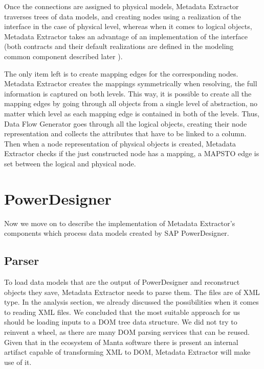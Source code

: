 Once the connections are assigned to physical models, Metadata Extractor traverses trees of data models, and creating nodes using a realization of the  interface in the case of physical level, whereas when it comes to logical objects, Metadata Extractor takes an advantage of an implementation of the  interface (both contracts and their default realizations are defined in the modeling common component described later ).

The only item left is to create mapping edges for the corresponding nodes.
Metadata Extractor creates the mappings symmetrically when resolving, the full information is captured on both levels. 
This way, it is possible to create all the mapping edges by going through all objects from a single level of abstraction, no matter which level as each mapping edge is contained in both of the levels.
Thus, Data Flow Generator goes through all the logical objects, creating their node representation and collects the attributes that have to be linked to a column.
Then when a node representation of physical objects is created, Metadata Extractor checks if the just constructed node has a mapping, a MAPS\textunderscore TO edge is set between the logical and physical node.

\section{PowerDesigner}

Now we move on to describe the implementation of Metadata Extractor's components which process data models created by SAP PowerDesigner.

\subsection{Parser}

To load data models that are the output of PowerDesigner and reconstruct objects they save, Metadata Extractor needs to parse them. The files are of XML type.
In the analysis section, we already discussed the possibilities when it comes to reading XML files. We concluded that the most suitable approach for us should be loading inputs to a DOM tree data structure.
We did not try to reinvent a wheel, as there are many DOM parsing services that can be reused. 
Given that in the ecosystem of Manta software there is present an internal artifact capable of transforming XML to DOM, Metadata Extractor will make use of it.

